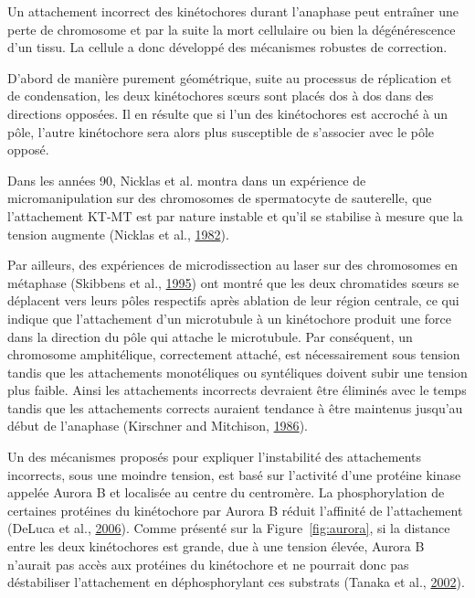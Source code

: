 \documentclass[12pt,a4paper,twoside,openright]{book}
\begin{document}
Un attachement incorrect des kinétochores durant l'anaphase peut
entraîner une perte de chromosome et par la suite la mort cellulaire ou
bien la dégénérescence d'un tissu. La cellule a donc développé des
mécanismes robustes de correction.

D'abord de manière purement géométrique, suite au processus de
réplication et de condensation, les deux kinétochores sœurs sont placés
dos à dos dans des directions opposées. Il en résulte que si l'un des
kinétochores est accroché à un pôle, l'autre kinétochore sera alors plus
susceptible de s'associer avec le pôle opposé.

Dans les années 90, Nicklas et al. montra dans un expérience de
micromanipulation sur des chromosomes de spermatocyte de sauterelle, que
l'attachement KT-MT est par nature instable et qu'il se stabilise à
mesure que la tension augmente (Nicklas et al.,
\hyperref[ref-Nicklas1982]{1982}).

Par ailleurs, des expériences de microdissection au laser sur des
chromosomes en métaphase (Skibbens et al.,
\hyperref[ref-Skibbens1995]{1995}) ont montré que les deux chromatides
sœurs se déplacent vers leurs pôles respectifs après ablation de leur
région centrale, ce qui indique que l'attachement d'un microtubule à un
kinétochore produit une force dans la direction du pôle qui attache le
microtubule. Par conséquent, un chromosome amphitélique, correctement
attaché, est nécessairement sous tension tandis que les attachements
monotéliques ou syntéliques doivent subir une tension plus faible. Ainsi
les attachements incorrects devraient être éliminés avec le temps tandis
que les attachements corrects auraient tendance à être maintenus
jusqu'au début de l'anaphase (Kirschner and Mitchison,
\hyperref[ref-Kirschner1986]{1986}).

Un des mécanismes proposés pour expliquer l'instabilité des attachements
incorrects, sous une moindre tension, est basé sur l'activité d'une
protéine kinase appelée Aurora B et localisée au centre du centromère.
La phosphorylation de certaines protéines du kinétochore par Aurora B
réduit l'affinité de l'attachement (DeLuca et al.,
\hyperref[ref-DeLuca2006]{2006}). Comme présenté sur la
Figure~\ref{fig:aurora}, si la distance entre les deux kinétochores est
grande, due à une tension élevée, Aurora B n'aurait pas accès aux
protéines du kinétochore et ne pourrait donc pas déstabiliser
l'attachement en déphosphorylant ces substrats (Tanaka et al.,
\hyperref[ref-Tanaka2002]{2002}).
\end{document}
